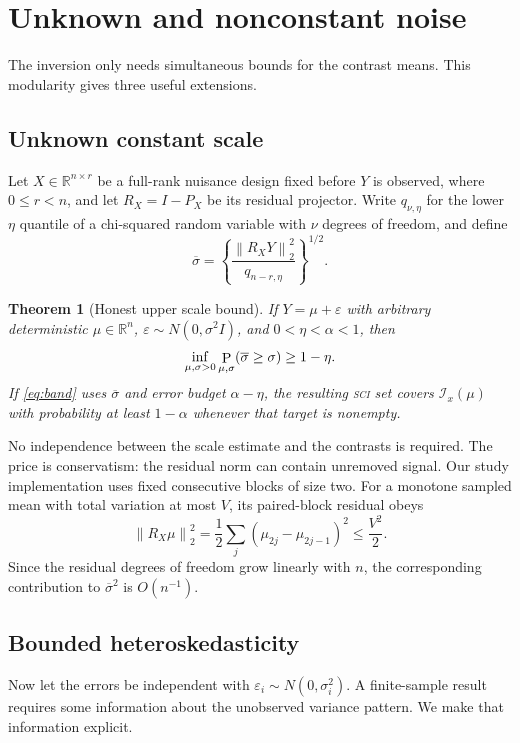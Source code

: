 \documentclass{interact}
\newtheorem{theorem}{Theorem}[section]
\theoremstyle{definition}
\theoremstyle{remark}
\newcommand{\R}{\mathbb{R}}
\newcommand{\I}{\mathcal{I}}
\newcommand{\Ph}{\mathop{\rm P}}
\newcommand{\norm}[1]{\left\lVert #1\right\rVert_2}
\newcommand{\SCI}{\textnormal{\textsc{sci}}\xspace}
\begin{document}
\section{Unknown and nonconstant noise}
\label{sec:extensions}

The inversion only needs simultaneous bounds for the contrast means.  This
modularity gives three useful extensions.

\subsection{Unknown constant scale}

Let $X\in\R^{n\times r}$ be a full-rank nuisance design fixed before $Y$ is
observed, where $0\leq r<n$, and let
$R_X=I-P_X$ be its residual projector.  Write
$q_{\nu,\eta}$ for the lower $\eta$ quantile of a chi-squared random variable
with $\nu$ degrees of freedom, and define
\begin{equation}
  \overline\sigma=
  \left\{\frac{\norm{R_XY}^2}{q_{n-r,\eta}}\right\}^{1/2}.
\label{eq:sigmabar}
\end{equation}

\begin{theorem}[Honest upper scale bound]
\label{thm:unknown}
If $Y=\mu+\varepsilon$ with arbitrary deterministic $\mu\in\R^n$,
$\varepsilon\sim N(0,\sigma^2I)$, and $0<\eta<\alpha<1$, then
\[
  \inf_{\mu,\sigma>0}\Ph_{\mu,\sigma}
  (\overline\sigma\geq\sigma)\geq1-\eta.
\]
If \eqref{eq:band} uses $\overline\sigma$ and error budget
$\alpha-\eta$, the resulting \SCI set covers $\I_x(\mu)$ with probability at
least $1-\alpha$ whenever that target is nonempty.
\end{theorem}

No independence between the scale estimate and the contrasts is required.
The price is conservatism: the residual norm can contain unremoved signal.
Our study implementation uses fixed consecutive blocks of size two.  For a
monotone sampled mean with total variation at most $V$, its paired-block
residual obeys
\[
 \norm{R_X\mu}^2
 =\frac12\sum_j(\mu_{2j}-\mu_{2j-1})^2\leq\frac{V^2}{2}.
\]
Since the residual degrees of freedom grow linearly with $n$, the corresponding
contribution to $\overline\sigma^2$ is $O(n^{-1})$.

\subsection{Bounded heteroskedasticity}

Now let the errors be independent with
$\varepsilon_i\sim N(0,\sigma_i^2)$.  A finite-sample result requires some
information about the unobserved variance pattern.  We make that information
explicit.
\end{document}
